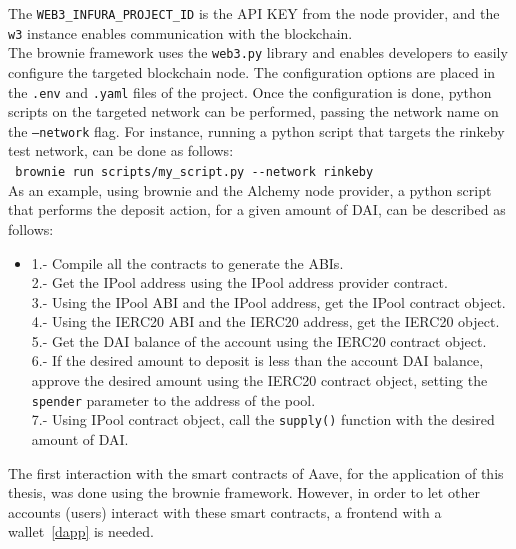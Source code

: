 \documentclass[11pt,a4paper]{report}
\begin{document}
The \verb|WEB3_INFURA_PROJECT_ID| is the API KEY from the node provider, and the \verb|w3| instance enables communication with the blockchain.\\
The brownie framework\cite{brow} uses the \verb|web3.py| library and enables developers to easily configure the targeted blockchain node. The configuration options are placed in the \verb|.env| and \verb|.yaml| files of the project. Once the configuration is done, python scripts on the targeted network can be performed, passing the network name on the \verb|–network| flag. For instance, running a python script that targets the rinkeby test network, can be done as follows:\\
\hspace{1cm}\verb| brownie run scripts/my_script.py --network rinkeby|\\
As an example, using brownie  and the Alchemy node provider, a python script that performs the deposit action, for a given amount of DAI, can be described as follows:
\begin{itemize}
	\item[]
	1.- Compile all the contracts to generate the ABIs.\\
	2.- Get the IPool address using the IPool address provider contract.\\
	3.- Using the IPool ABI and the IPool address, get the IPool contract object.\\
	4.- Using the IERC20 ABI and the IERC20 address, get the IERC20 object.\\
	5.- Get the DAI balance of the account using the IERC20 contract object.\\
	6.- If the desired amount to deposit is less than the account DAI balance, approve the desired amount using the IERC20 contract object, setting the \verb|spender| parameter to the address of the pool.\\
	7.- Using IPool contract object, call the \verb|supply()| function with the desired amount of DAI.
\end{itemize}
The first interaction with the smart contracts of Aave, for the application of this thesis, was done using the brownie framework. However, in order to let other accounts (users) interact with these smart contracts, a frontend with a wallet~\ref{dapp} is needed.
\end{document}
